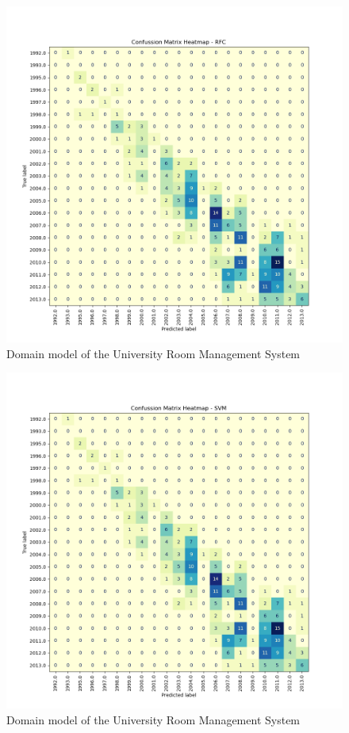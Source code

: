 \documentclass[conference,onecolumn]{IEEEtran}
\begin{document}
    \begin{figure}[H]
		\centering
		\includegraphics[width=1\textwidth]{Plots/CM_Heatmap_RFC.png}
		\caption{Domain model of the University Room Management System}
		\label{appx:cmheatmaprfc}
	\end{figure}
    \begin{figure}[H]
		\centering
		\includegraphics[width=1\textwidth]{Plots/CM_Heatmap_SVM.png}
		\caption{Domain model of the University Room Management System}
		\label{appx:cmheatmapsvm}
	\end{figure}
\newpage


\end{document}
